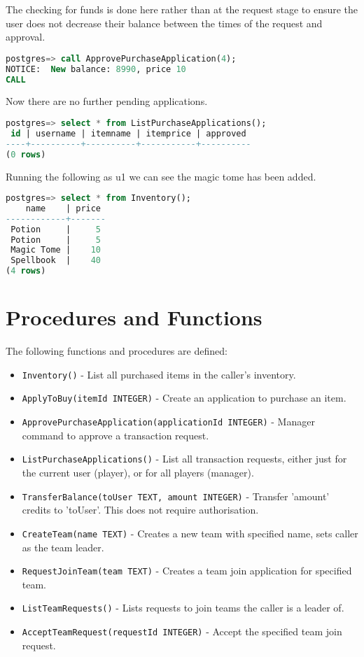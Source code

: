 The checking for funds is done here rather than at the request stage to ensure the user does not decrease their balance between
the times of the request and approval.

\begin{lstlisting}[language=SQL]
postgres=> call ApprovePurchaseApplication(4);
NOTICE:  New balance: 8990, price 10
CALL
\end{lstlisting}

Now there are no further pending applications.

\begin{lstlisting}[language=SQL]
postgres=> select * from ListPurchaseApplications();
 id | username | itemname | itemprice | approved 
----+----------+----------+-----------+----------
(0 rows)
\end{lstlisting}

Running the following as u1 we can see the magic tome has been added.

\begin{lstlisting}[language=SQL]
postgres=> select * from Inventory();
    name    | price 
------------+-------
 Potion     |     5
 Potion     |     5
 Magic Tome |    10
 Spellbook  |    40
(4 rows)
\end{lstlisting}


\section{Procedures and Functions}

The following functions and procedures are defined:

\begin{itemize}
    \item \verb|Inventory()| - List all purchased items in the caller's inventory.
    \item \verb|ApplyToBuy(itemId INTEGER)| - Create an application to purchase an item.
    \item \verb|ApprovePurchaseApplication(applicationId INTEGER)| - Manager command to approve a transaction request.
    \item \verb|ListPurchaseApplications()| - List all transaction requests, either just for the current user (player), or for all players (manager).
    \item \verb|TransferBalance(toUser TEXT, amount INTEGER)| - Transfer 'amount' credits to 'toUser'. This does not require authorisation.
    \item \verb|CreateTeam(name TEXT)| - Creates a new team with specified name, sets caller as the team leader.
    \item \verb|RequestJoinTeam(team TEXT)| - Creates a team join application for specified team.
    \item \verb|ListTeamRequests()| - Lists requests to join teams the caller is a leader of.
    \item \verb|AcceptTeamRequest(requestId INTEGER)| - Accept the specified team join request.
\end{itemize}
